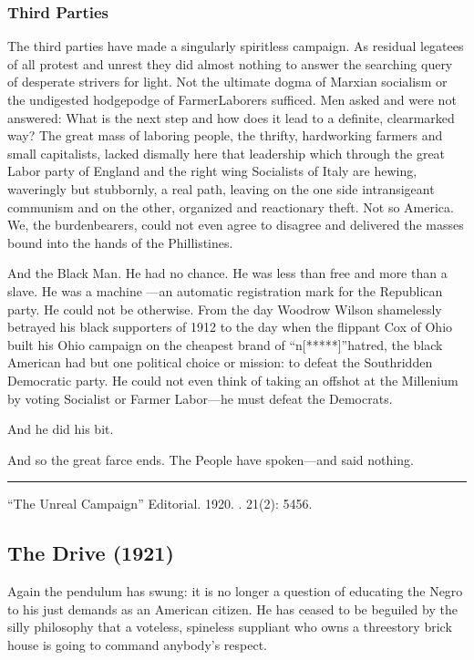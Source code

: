 \documentclass[letterpaper,10pt,english]{jupyterBook}
\begin{document}
\subsubsection{Third Parties}
\label{\detokenize{Volumes/21/02/unreal_campaign:third-parties}}
\sphinxAtStartPar
The third parties have made a singularly spiritless campaign. As residual legatees of all protest and unrest they did almost nothing to answer the searching query of desperate strivers for light. Not the ultimate dogma of Marxian socialism or the undigested hodge\sphinxhyphen{}podge of Farmer\sphinxhyphen{}Laborers sufficed. Men asked and were not answered: What is the next step and how does it lead to a definite, clearmarked way? The great mass of laboring people, the thrifty, hardworking farmers and small capitalists, lacked dismally here that leadership which through the great Labor party of England and the right wing Socialists of Italy are hewing, waveringly but stubbornly, a real path, leaving on the one side intransigeant communism and on the other, organized and reactionary theft. Not so America. We, the burden\sphinxhyphen{}bearers, could not even agree to disagree and delivered the masses bound into the hands of the Phillistines.

\sphinxAtStartPar
And the Black Man. He had no chance. He was less than free and more than a slave. He was a machine —an automatic registration mark for the Republican party. He could not be otherwise. From the day Woodrow Wilson shamelessly betrayed his black supporters of 1912 to the day when the flippant Cox of Ohio built his Ohio campaign on the cheapest brand of “n{[}*****{]}”\sphinxhyphen{}hatred, the black American had but one political choice or mission: to defeat the South\sphinxhyphen{}ridden Democratic party. He could not even think of taking an off\sphinxhyphen{}shot at the Millenium by voting Socialist or Farmer Labor—he must defeat the Democrats.

\sphinxAtStartPar
And he did his bit.

\sphinxAtStartPar
And so the great farce ends. The People have spoken—and said nothing.


\bigskip\hrule\bigskip


\sphinxAtStartPar
{} “The Unreal Campaign” Editorial. 1920. . 21(2): 54\sphinxhyphen{}56.


\subsection{The Drive (1921)}
\label{\detokenize{Volumes/22/01/drive:the-drive-1921}}\label{\detokenize{Volumes/22/01/drive::doc}}
\sphinxAtStartPar
Again the pendulum has swung: it is no longer a question of educating the Negro to his just demands as an American citizen. He has ceased to be beguiled by the silly philosophy that a voteless, spineless suppliant who owns a three\sphinxhyphen{}story brick house is going to command anybody’s respect.
\end{document}
